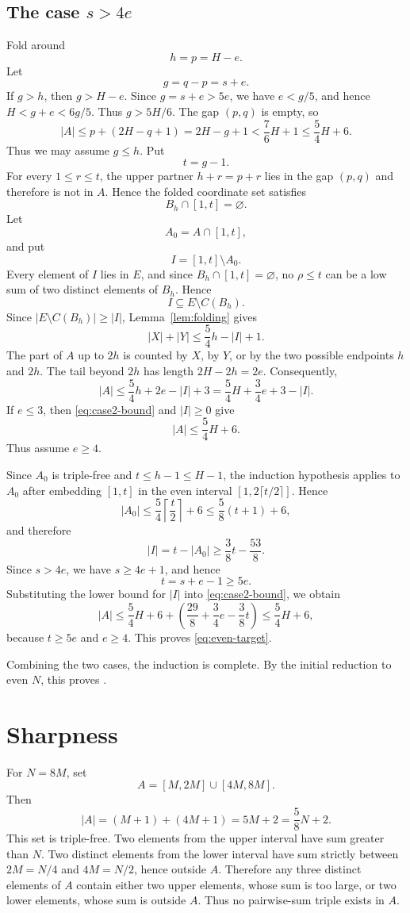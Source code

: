 \documentclass[11pt]{amsart}
\theoremstyle{definition}
\begin{document}
\subsection{The case \texorpdfstring{$s>4e$}{s > 4e}}
Fold around
\[
  h=p=H-e.
\]
Let
\[
  g=q-p=s+e.
\]
If $g>h$, then $g>H-e$. Since $g=s+e>5e$, we have $e<g/5$, and hence $H<g+e<6g/5$. Thus $g>5H/6$. The gap $(p,q)$ is empty, so
\[
  |A|\leq p+(2H-q+1)=2H-g+1<\frac76H+1\leq \frac54H+6.
\]
Thus we may assume $g\leq h$. Put
\[
  t=g-1.
\]
For every $1\leq r\leq t$, the upper partner $h+r=p+r$ lies in the gap $(p,q)$ and therefore is not in $A$. Hence the folded coordinate set satisfies
\[
  B_h\cap[1,t]=\varnothing.
\]
Let
\[
  A_0=A\cap[1,t],
\]
and put
\[
  I=[1,t]\setminus A_0.
\]
Every element of $I$ lies in $E$, and since $B_h\cap[1,t]=\varnothing$, no $\rho\leq t$ can be a low sum of two distinct elements of $B_h$. Hence
\[
  I\subseteq E\setminus C(B_h).
\]
Since $|E\setminus C(B_h)|\geq |I|$, Lemma~\ref{lem:folding} gives
\[
  |X|+|Y|\leq \frac54h-|I|+1.
\]
The part of $A$ up to $2h$ is counted by $X$, by $Y$, or by the two possible endpoints $h$ and $2h$. The tail beyond $2h$ has length $2H-2h=2e$. Consequently,
\begin{equation}\label{eq:case2-bound}
  |A|\leq \frac54h+2e-|I|+3
  =\frac54H+\frac34e+3-|I|.
\end{equation}
If $e\leq 3$, then \eqref{eq:case2-bound} and $|I|\geq 0$ give
\[
  |A|\leq \frac54H+6.
\]
Thus assume $e\geq 4$.

Since $A_0$ is triple-free and $t\leq h-1\leq H-1$, the induction hypothesis applies to $A_0$ after embedding $[1,t]$ in the even interval $[1,2\lceil t/2\rceil]$. Hence
\[
  |A_0|\leq \frac54\left\lceil\frac t2\right\rceil+6\leq \frac58(t+1)+6,
\]
and therefore
\[
  |I|=t-|A_0|\geq \frac38t-\frac{53}{8}.
\]
Since $s>4e$, we have $s\geq 4e+1$, and hence
\[
  t=s+e-1\geq 5e.
\]
Substituting the lower bound for $|I|$ into \eqref{eq:case2-bound}, we obtain
\[
  |A|\leq \frac54H+6+\left(\frac{29}{8}+\frac34e-\frac38t\right)\leq \frac54H+6,
\]
because $t\geq 5e$ and $e\geq 4$. This proves \eqref{eq:even-target}.

Combining the two cases, the induction is complete. By the initial reduction to even $N$, this proves .

\section{Sharpness}

For $N=8M$, set
\[
  A=[M,2M]\cup[4M,8M].
\]
Then
\[
  |A|=(M+1)+(4M+1)=5M+2=\frac58N+2.
\]
This set is triple-free. Two elements from the upper interval have sum greater than $N$. Two distinct elements from the lower interval have sum strictly between $2M=N/4$ and $4M=N/2$, hence outside $A$. Therefore any three distinct elements of $A$ contain either two upper elements, whose sum is too large, or two lower elements, whose sum is outside $A$. Thus no pairwise-sum triple exists in $A$.
\end{document}
